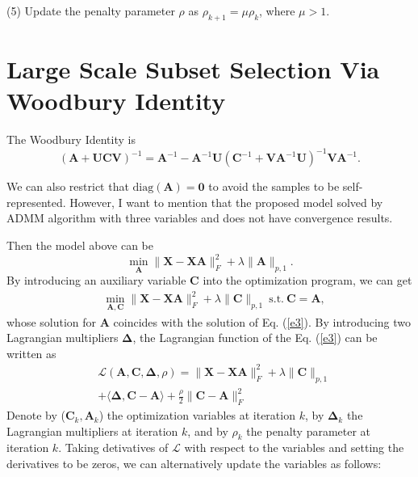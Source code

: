 \documentclass[10pt,twocolumn,letterpaper]{article}
\begin{document}
(5) Update the penalty parameter $\rho$ as $\rho_{k+1}=\mu\rho_{k}$, where $\mu>1$.


\section{Large Scale Subset Selection Via Woodbury Identity}

The Woodbury Identity is 
\begin{equation}
(
\bm{A}
+
\bm{U}
\bm{C}
\bm{V}
)^{-1}
=
\bm{A}^{-1}
-
\bm{A}^{-1}
\bm{U}
(
\bm{C}^{-1}
+
\bm{V}\bm{A}^{-1}\bm{U}
)^{-1}
\bm{V}\bm{A}^{-1}
.
\end{equation}



We can also restrict that $\text{diag}(\bm{A})=\bm{0}$ to avoid the samples to be self-represented. However, I want to mention that the proposed model solved by ADMM algorithm with three variables and does not have convergence results.

Then the model above can be 
\begin{equation}
\label{e2}
\min_{\bm{A}}
\|
\bm{X}
-
\bm{X}\bm{A}
\|_{F}^{2}
+
\lambda
\|
\bm{A}
\|_{p,1}
.
\end{equation}
By introducing an auxiliary variable $\bm{C}$ into the optimization program, we can get
\begin{equation}
\begin{split}
\label{e3}
&
\min_{\bm{A},\bm{C}}
\|
\bm{X}
-
\bm{X}\bm{A}
\|_{F}^{2}
+
\lambda
\|
\bm{C}
\|_{p,1}
\ 
\text{s.t.}
\ 
\bm{C}=\bm{A}
,
\end{split}
\end{equation}
whose solution for $\bm{A}$ coincides with the solution of Eq. (\ref{e3}). By introducing two Lagrangian multipliers $\bm{\Delta}$, the Lagrangian function of the Eq. (\ref{e3}) can be written as
\begin{equation}
\begin{split}
\label{e5}
&
\mathcal{L}
(\bm{A},\bm{C},\bm{\Delta},\rho)
=
\|
\bm{X}
-
\bm{X}\bm{A}
\|_{F}^{2}
+
\lambda
\|
\bm{C}
\|_{p,1}
\\
&
+
\langle
\bm{\Delta},
\bm{C}-\bm{A}
\rangle
+
\frac{\rho}{2}
\|
\bm{C}-\bm{A}
\|_{F}^{2}
\end{split}
\end{equation}
Denote by ($\bm{C}_{k},\bm{A}_{k}$) the optimization variables at iteration $k$, by $\bm{\Delta}_{k}$ the Lagrangian multipliers at iteration $k$, and by $\rho_{k}$ the penalty parameter at iteration $k$. Taking detivatives of $\mathcal{L}$ with respect to the variables and setting the derivatives to be zeros, we can alternatively update the variables as follows:
\end{document}

